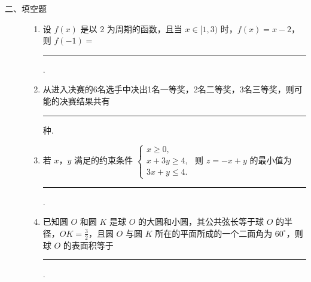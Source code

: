 \begin{description}

    \item[二、填空题]

    \begin{enumerate}[leftmargin=5pt]

      \addtocounter{enumi}{+12}

        \item 设 \( f(x) \) 是以 2 为周期的函数，且当 \( x \in [1,3) \) 时，\( f(x) = x - 2 \)，则 \( f(-1) = \)\rule[-0.3ex]{3em}{0.4pt}.

        \item 从进入决赛的6名选手中决出1名一等奖，2名二等奖，3名三等奖，则可能的决赛结果共有\rule[-0.3ex]{3em}{0.4pt} 种.

        \item 若 \(x\)，\(y\) 满足的约束条件 \(\begin{cases}
x\geqslant 0,\\
x + 3y\geqslant 4,\\
3x + y\leqslant 4.
\end{cases}\) 则 \(z = -x + y\) 的最小值为\rule[-0.3ex]{3em}{0.4pt}.

        \item 已知圆 \(O\) 和圆 \(K\) 是球 \(O\) 的大圆和小圆，其公共弦长等于球 \(O\) 的半径，\(OK = \frac{3}{2}\)，且圆 \(O\) 与圆 \(K\) 所在的平面所成的一个二面角为 \(60^{\circ}\)，则球 \(O\) 的表面积等于\rule[-0.3ex]{3em}{0.4pt}.

    \end{enumerate}

\end{description}

